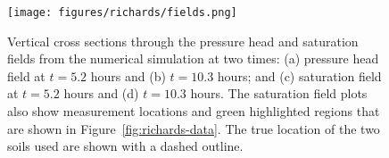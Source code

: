 \begin{figure}[ht]
\begin{center}
\texttt{[image: figures/richards/fields.png]}
\end{center}
\caption{Vertical cross sections through the pressure head and saturation fields from the numerical simulation at two times: (a) pressure head field at $t=5.2$ hours and (b) $t=10.3$ hours; and (c) saturation field at $t=5.2$ hours and (d) $t=10.3$ hours. The saturation field plots also show measurement locations and green highlighted regions that are shown in Figure~\ref{fig:richards-data}. The true location of the two soils used are shown with a dashed outline.}
\label{fig:richards-fields}
\end{figure}
